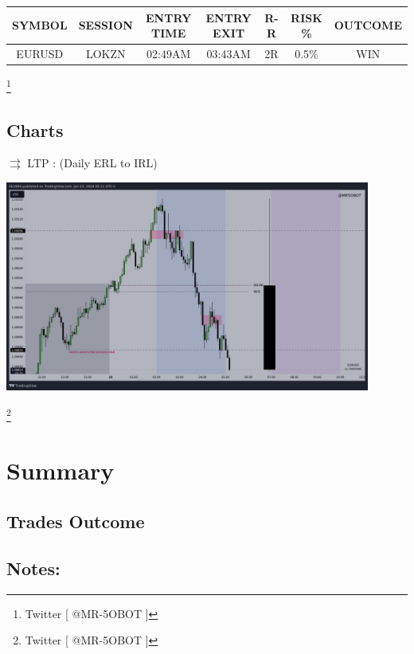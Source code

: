 \documentclass{article}
\begin{document}
\vspace{0.5cm}
\begin{center}
\begin{tabular}{|c|c|c|c|c|c|c|}
  \hline
  SYMBOL & SESSION & ENTRY TIME & ENTRY EXIT & R-R & RISK \% & OUTCOME \\ 
  \hline 
  EURUSD & LOKZN & 02:49AM & 03:43AM & 2R & 0.5\% & WIN \\  
  \hline
\end{tabular}
\end{center}
\vspace{1cm}

\footnote{Twitter [ @MR-5OBOT ]}


\subsection{Charts}
\vspace{0.4cm}

\( \rightrightarrows \) \hspace{0.1cm}LTP : (Daily ERL to IRL)

\vspace{0.5cm}
\includegraphics[width=0.9\textwidth]{./figures/chart1.jpg}

\footnote{Twitter [ @MR-5OBOT ]}
\section{Summary}
\subsection{Trades Outcome}
\subsection{Notes:}

\end{document}

